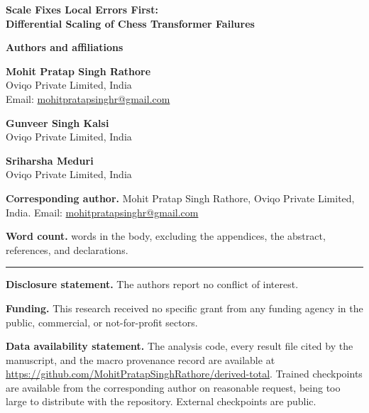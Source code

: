 \documentclass[11pt]{article}
\begin{document}
\begin{center}
{\LARGE\bf Scale Fixes Local Errors First:\\[0.3em]
Differential Scaling of Chess Transformer Failures}
\end{center}

\vspace{1.5em}

\noindent\textbf{Authors and affiliations}

\vspace{0.6em}
\noindent\textbf{Mohit Pratap Singh Rathore}\\
Oviqo Private Limited, India\\
Email: \href{mailto:mohitpratapsinghr@gmail.com}{mohitpratapsinghr@gmail.com}

\vspace{0.6em}
\noindent\textbf{Gunveer Singh Kalsi}\\
Oviqo Private Limited, India

\vspace{0.6em}
\noindent\textbf{Sriharsha Meduri}\\
Oviqo Private Limited, India

\vspace{1.2em}
\noindent\textbf{Corresponding author.} Mohit Pratap Singh Rathore, Oviqo Private
Limited, India. Email:
\href{mailto:mohitpratapsinghr@gmail.com}{mohitpratapsinghr@gmail.com}

\vspace{1.2em}
\noindent\textbf{Word count.}  words in the body, excluding the appendices,
the abstract, references, and declarations.

\vspace{2em}
\noindent\rule{\linewidth}{0.4pt}

\vspace{1em}

\vspace{0.8em}
\noindent\textbf{Disclosure statement.} The authors report no conflict of interest.

\vspace{0.6em}
\noindent\textbf{Funding.} This research received no specific grant from any funding
agency in the public, commercial, or not-for-profit sectors.

\vspace{0.6em}
\noindent\textbf{Data availability statement.} The analysis code, every result file
cited by the manuscript, and the macro provenance record are available at
\url{https://github.com/MohitPratapSinghRathore/derived-total}. Trained checkpoints
are available from the corresponding author on reasonable request, being too large
to distribute with the repository. External checkpoints are public.
\end{document}
